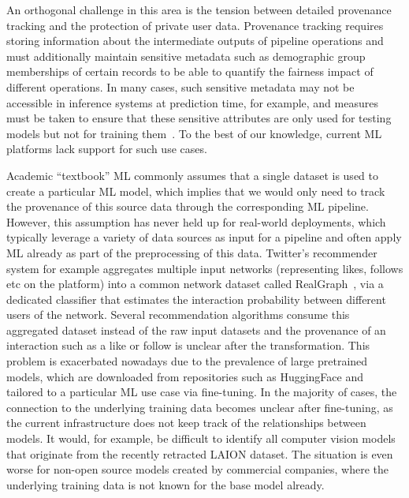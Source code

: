 An orthogonal challenge in this area is the tension between detailed provenance tracking and the protection of private user data. Provenance tracking requires storing information about the intermediate outputs of pipeline operations and must additionally maintain sensitive metadata such as demographic group memberships of certain records to be able to quantify the fairness impact of different operations. In many cases, such sensitive metadata may not be accessible in inference systems at prediction time, for example, and measures must be taken to ensure that these sensitive attributes are only used for testing models but not for training them~\cite{euaiact}. To the best of our knowledge, current ML platforms lack support for such use cases.


 Academic ``textbook'' ML commonly assumes that a single dataset is used to create a particular ML model, which implies that we would only need to track the provenance of this source data through the corresponding ML pipeline. However, this assumption has never held up for real-world deployments, which typically leverage a variety of data sources as input for a pipeline and often apply ML already as part of the preprocessing of this data. Twitter's recommender system for example aggregates multiple input networks (representing likes, follows etc on the platform) into a common network dataset called RealGraph~\cite{kamath2014realgraph}, via a dedicated classifier that estimates the interaction probability between different users of the network. Several recommendation algorithms consume this aggregated dataset instead of the raw input datasets and the provenance of an interaction such as a like or follow is unclear after the transformation. This problem is exacerbated nowadays due to the prevalence of large pretrained models, which are downloaded from repositories such as HuggingFace and tailored to a particular ML use case via fine-tuning. In the majority of cases, the connection to the underlying training data becomes unclear after fine-tuning, as the current infrastructure does not keep track of the relationships between models. It would, for example, be difficult to identify all computer vision models that originate from the recently retracted LAION dataset. The situation is even worse for non-open source models created by commercial companies, where the underlying training data is not known for the base model already.

